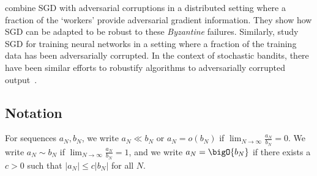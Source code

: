 \documentclass{article}
\begin{document}
\citet{alistarh2018byzantine} combine SGD with adversarial corruptions in a distributed setting where a fraction of the `workers' provide adversarial gradient information. They show how SGD can be adapted to be robust to these \emph{Byzantine} failures.
Similarly, \citet{wang2021robust} study SGD for training neural networks in a setting where a fraction of the training data has been adversarially corrupted.
In the context of stochastic bandits, there have been similar efforts to robustify algorithms to adversarially corrupted output~\citep{lykouris2018stochastic}.

















\subsection*{Notation}
For sequences $a_N,b_N$, we write $a_N\ll b_N$ or $a_N=o(b_N)$ if $\lim_{N\to\infty}\frac{a_N}{b_N}=0$. We write $a_N\sim b_N$ if $\lim_{N\to\infty}\frac{a_N}{b_N}=1$, and we write $a_N=\bigO{b_N}$ if there exists a $c>0$ such that $|a_N|\le c|b_N|$ for all $N$. %
\end{document}

